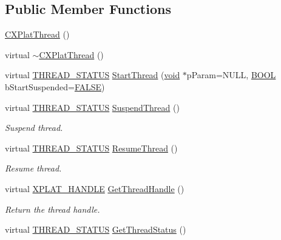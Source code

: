 \subsection*{\-Public \-Member \-Functions}
\begin{DoxyCompactItemize}
\item 
\hyperlink{class_c_x_plat_thread_a1eb15fa5d9fd621822bce0ef40cc25ed}{\-C\-X\-Plat\-Thread} ()
\item 
virtual \hyperlink{class_c_x_plat_thread_a3ce5dcd1f7b89fe1aff7650914d8e2c9}{$\sim$\-C\-X\-Plat\-Thread} ()
\item 
virtual \hyperlink{class_c_x_plat_thread_a15b8bc4370560890e1a1ae0dce671c01}{\-T\-H\-R\-E\-A\-D\-\_\-\-S\-T\-A\-T\-U\-S} \hyperlink{class_c_x_plat_thread_a9ebb03bd1483413fbcbdb6510a67167f}{\-Start\-Thread} (\hyperlink{_cpclient_8h_a6464f7480a0fd0ee170cba12b2c0497f}{void} $\ast$p\-Param=\-N\-U\-L\-L, \hyperlink{_cpclient_8h_a3be13892ae7076009afcf121347dd319}{\-B\-O\-O\-L} b\-Start\-Suspended=\hyperlink{_x_plat_8h_aa93f0eb578d23995850d61f7d61c55c1}{\-F\-A\-L\-S\-E})
\item 
virtual \hyperlink{class_c_x_plat_thread_a15b8bc4370560890e1a1ae0dce671c01}{\-T\-H\-R\-E\-A\-D\-\_\-\-S\-T\-A\-T\-U\-S} \hyperlink{class_c_x_plat_thread_a1f6aeadb170ca467a5a07cde7104e362}{\-Suspend\-Thread} ()
\begin{DoxyCompactList}\small\item\em \-Suspend thread. \end{DoxyCompactList}\item 
virtual \hyperlink{class_c_x_plat_thread_a15b8bc4370560890e1a1ae0dce671c01}{\-T\-H\-R\-E\-A\-D\-\_\-\-S\-T\-A\-T\-U\-S} \hyperlink{class_c_x_plat_thread_ab8332931990edf82093e5905d4fd2c36}{\-Resume\-Thread} ()
\begin{DoxyCompactList}\small\item\em \-Resume thread. \end{DoxyCompactList}\item 
virtual \hyperlink{_x_plat_8h_af3c5c1485bb09f4be888d78cdaf93e00}{\-X\-P\-L\-A\-T\-\_\-\-H\-A\-N\-D\-L\-E} \hyperlink{class_c_x_plat_thread_a18d5ad4291e0adb5c54694043aebd4f2}{\-Get\-Thread\-Handle} ()
\begin{DoxyCompactList}\small\item\em \-Return the thread handle. \end{DoxyCompactList}\item 
virtual \hyperlink{class_c_x_plat_thread_a15b8bc4370560890e1a1ae0dce671c01}{\-T\-H\-R\-E\-A\-D\-\_\-\-S\-T\-A\-T\-U\-S} \hyperlink{class_c_x_plat_thread_a5f60c36cb20e3b5d85d8ef506d9d8bf1}{\-Get\-Thread\-Status} ()

\end{DoxyCompactItemize}
